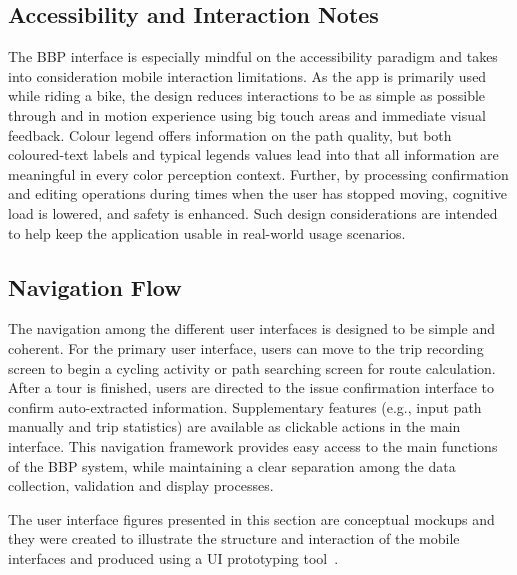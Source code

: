 \subsection{Accessibility and Interaction Notes}

The BBP interface is especially mindful on the accessibility paradigm and takes into consideration mobile interaction limitations.
As the app is primarily used while riding a bike, the design reduces interactions to be as simple as possible through and in motion experience using big touch areas and immediate visual feedback.
Colour legend offers information on the path quality, but both coloured-text labels and typical legends values lead into that all information are meaningful in every color perception context.
Further, by processing confirmation and editing operations during times when the user has stopped moving, cognitive load is lowered, and safety is enhanced.
Such design considerations are intended to help keep the application usable in real-world usage scenarios.

\subsection{Navigation Flow}

The navigation among the different user interfaces is designed to be simple and coherent.
For the primary user interface, users can move to the trip recording screen to begin a cycling activity or path searching screen for route calculation.
After a tour is finished, users are directed to the issue confirmation interface to confirm auto-extracted information.
Supplementary features (e.g., input path manually and trip statistics) are available as clickable actions in the main interface.
This navigation framework provides easy access to the main functions of the BBP system, while maintaining a clear separation among the data collection, validation and display processes.

The user interface figures presented in this section are conceptual mockups and they were created to illustrate the structure and interaction of the mobile interfaces and produced using a UI prototyping tool~\cite{figma}.